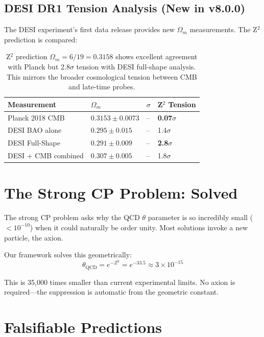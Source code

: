 \documentclass[11pt,a4paper]{article}
\theoremstyle{plain}
\theoremstyle{definition}
\theoremstyle{remark}
\begin{document}
\subsection{DESI DR1 Tension Analysis (New in v8.0.0)}

The DESI experiment's first data release provides new $\Omega_m$ measurements. The Z$^2$ prediction is compared:

\begin{table}[h!]
\centering
\begin{tabular}{llll}
\toprule
\textbf{Measurement} & $\Omega_m$ & $\sigma$ & \textbf{Z$^2$ Tension} \\
\midrule
Planck 2018 CMB & $0.3153 \pm 0.0073$ & -- & \textbf{0.07$\sigma$} \\
DESI BAO alone & $0.295 \pm 0.015$ & -- & 1.4$\sigma$ \\
DESI Full-Shape & $0.291 \pm 0.009$ & -- & \textbf{2.8$\sigma$} \\
DESI + CMB combined & $0.307 \pm 0.005$ & -- & 1.8$\sigma$ \\
\bottomrule
\end{tabular}
\caption{Z$^2$ prediction $\Omega_m = 6/19 = 0.3158$ shows excellent agreement with Planck but 2.8$\sigma$ tension with DESI full-shape analysis. This mirrors the broader cosmological tension between CMB and late-time probes.}
\end{table}

\section{The Strong CP Problem: Solved}

The strong CP problem asks why the QCD $\theta$ parameter is so incredibly small ($<10^{-10}$) when it could naturally be order unity. Most solutions invoke a new particle, the axion.

Our framework solves this geometrically:
\[
\theta_{\text{QCD}} = e^{-Z^2} = e^{-33.5} \approx 3 \times 10^{-15}
\]

This is 35,000 times smaller than current experimental limits. No axion is required---the suppression is automatic from the geometric constant.

\section{Falsifiable Predictions}
\end{document}
